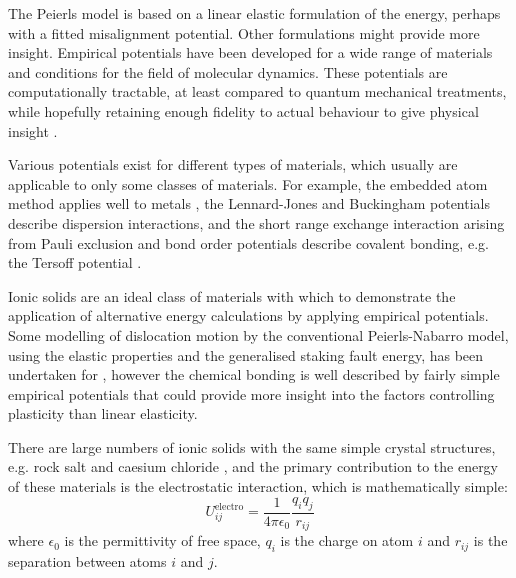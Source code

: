 


The Peierls model is based on a linear elastic formulation of the energy, perhaps with a fitted misalignment potential. Other formulations might provide more insight. Empirical potentials have been developed for a wide range of materials and conditions for the field of molecular dynamics. These potentials are computationally tractable, at least compared to quantum mechanical treatments, while hopefully retaining enough fidelity to actual behaviour to give physical insight \cite{martinez2013}.

Various potentials exist for different types of materials, which usually are applicable to only some classes of materials. For example, the embedded atom method applies well to metals \cite{Daw1984}, the Lennard-Jones and Buckingham potentials describe dispersion interactions, and the short range exchange interaction arising from Pauli exclusion \cite{Jones1924,Buckingham1938} and bond order potentials describe covalent bonding, e.g. the Tersoff potential \cite{Tersoff1988}. 


Ionic solids are an ideal class of materials with which to demonstrate the application of alternative energy calculations by applying empirical potentials. Some modelling of dislocation motion by the conventional Peierls-Nabarro model, using the elastic properties and the generalised staking fault energy, has been undertaken for  \cite{Miranda2005}, however the chemical bonding is well described by fairly simple empirical potentials that could provide more insight into the factors controlling plasticity than linear elasticity. 

There are large numbers of ionic solids with the same simple crystal structures, e.g. rock salt and caesium chloride \cite{Kelly2012app7}, and the primary contribution to the energy of these materials is the electrostatic interaction, which is mathematically simple:
\begin{equation}
U^{\text{electro}}_{ij} = \frac{1}{4\pi\epsilon_0} \frac{q_i q_j}{r_{ij}}
\end{equation}
where $\epsilon_0$ is the permittivity of free space, $q_i$ is the charge on atom $i$ and $r_{ij}$ is the separation between atoms $i$ and $j$.


